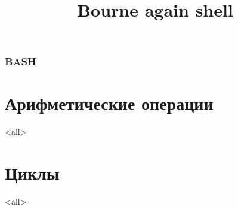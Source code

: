 
\title[bash]{Bourne again shell}




\begin{frame}
	\frametitle{BASH}
	\titlepage
	\vspace{-0.5cm}
	\begin{center}
	\end{center}
\end{frame}

\begin{frame}
	\tableofcontents
\end{frame}




\section{Арифметические операции}

\mode<all>{}

\section{Циклы}

\mode<all>{}


